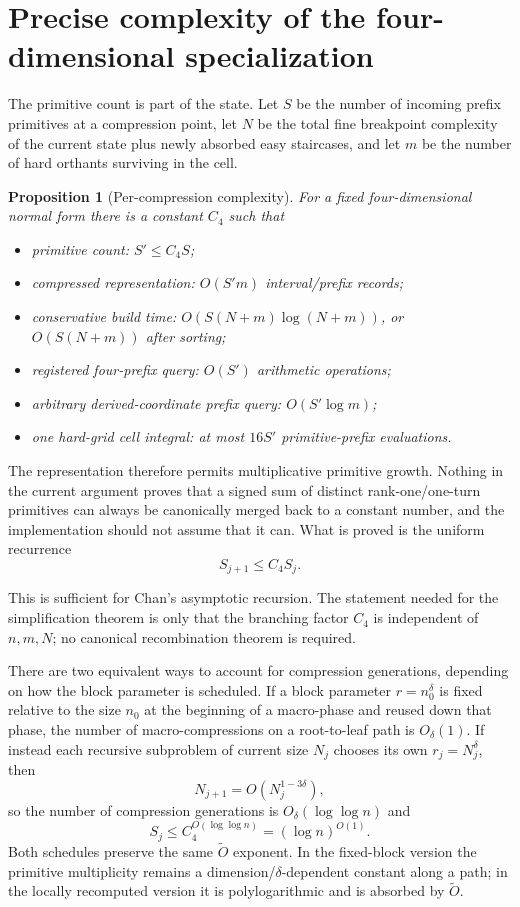 \documentclass[12pt,a4paper]{article}
\newtheorem{proposition}[theorem]{Proposition}
\theoremstyle{definition}
\newcommand{\1}{\mathbf 1}
\begin{document}
\section{Precise complexity of the four-dimensional specialization}

The primitive count is part of the state.  Let $S$ be the number of incoming prefix primitives at a compression point, let $N$ be the total fine breakpoint complexity of the current state plus newly absorbed easy staircases, and let $m$ be the number of hard orthants surviving in the cell.

\begin{proposition}[Per-compression complexity]                   \label{prop:complexity}
For a fixed four-dimensional normal form there is a constant $C_4$ such that
\begin{itemize}[leftmargin=2em]
\item primitive count: $S'\le C_4S$;
\item compressed representation: $O(S'm)$ interval/prefix records;
\item conservative build time: $O(S(N+m)\log(N+m))$, or $O(S(N+m))$ after sorting;
\item registered four-prefix query: $O(S')$ arithmetic operations;
\item arbitrary derived-coordinate prefix query: $O(S'\log m)$;
\item one hard-grid cell integral: at most $16S'$ primitive-prefix evaluations.
\end{itemize}
\end{proposition}

The representation therefore permits multiplicative primitive growth.  Nothing in the current argument proves that a signed sum of distinct rank-one/one-turn primitives can always be canonically merged back to a constant number, and the implementation should not assume that it can.  What is proved is the uniform recurrence
\[
S_{j+1}\le C_4S_j.
\]

This is sufficient for Chan's asymptotic recursion.  The statement needed for the simplification theorem is only that the branching factor $C_4$ is independent of $n,m,N$; no canonical recombination theorem is required.

There are two equivalent ways to account for compression generations, depending on how the block parameter is scheduled.  If a block parameter $r=n_0^{\delta}$ is fixed relative to the size $n_0$ at the beginning of a macro-phase and reused down that phase, the number of macro-compressions on a root-to-leaf path is $O_{\delta}(1)$.  If instead each recursive subproblem of current size $N_j$ chooses its own $r_j=N_j^{\delta}$, then
\[
N_{j+1}=O(N_j^{1-3\delta}),
\]
so the number of compression generations is $O_{\delta}(\log\log n)$ and
\[
S_j\le C_4^{O(\log\log n)}=(\log n)^{O(1)}.
\]
Both schedules preserve the same $\widetilde O$ exponent.  In the fixed-block version the primitive multiplicity remains a dimension/$\delta$-dependent constant along a path; in the locally recomputed version it is polylogarithmic and is absorbed by $\widetilde O$.
\end{document}

